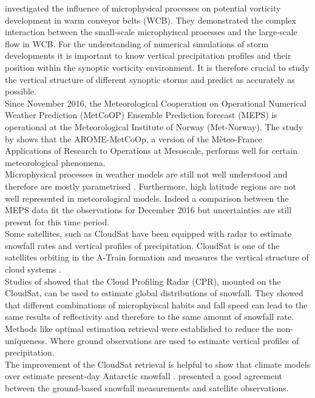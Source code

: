 \cite{joos_influence_2012} investigated the influence of microphysical processes on potential vorticity development in warm conveyor belts (WCB). They demonstrated the complex interaction between the small-scale microphyiscal processes and the large-scale flow in WCB. 
For the understanding of numerical simulations of storm developments it is important to know vertical precipitation profiles and their position within the synoptic vorticity environment. It is therefore crucial to study the vertical structure of different synoptic storms and  predict as accurately as possible.\\
% 
Since November 2016, the Meteorological Cooperation on Operational Numerical Weather Prediction (MetCoOP) Ensemble Prediction forecast (MEPS) is operational at the Meteorological Institute of Norway (Met-Norway). The study by \cite{muller_arome-metcoop:_2017} shows that the AROME-MetCoOp, a version of the Mèteo-France Applications of Research to Operations at Mesoscale, performs well for certain meteorological phenomena. \\
Microphysical processes in weather models are still not well understood and therefore are mostly parametrised \citep{muller_arome-metcoop:_2017}. Furthermore, high latitude regions are not well represented in meteorological models. Indeed a comparison between the MEPS data fit the observations for December 2016 but uncertainties are still present for this time period. 
\\
Some satellites, such as CloudSat have been equipped with radar to estimate snowfall rates and vertical profiles of precipitation. CloudSat is one of the satellites orbiting in the A-Train formation and measures the vertical structure of cloud systems \citep{stephens_cloudsat_2002}. 
\\
Studies of \cite{kulie_utilizing_2009} showed that the Cloud Profiling Radar (CPR), mounted on the CloudSat, can be used to estimate global distributions of snowfall. They showed that different combinations of microphyiscal habits and fall speed can lead to the same results of reflectivity and therefore to the same amount of snowfall rate.
Methods like optimal estimation retrieval were established to reduce the non-uniqueness. Where ground observations are used to estimate vertical profiles of precipitation.\\
The improvement of the CloudSat retrieval is helpful to show that climate models over estimate present-day Antarctic snowfall \citep{palerme_evaluation_2017}. \citet{norin_intercomparison_2015} presented a good agreement between the ground-based snowfall measurements and satellite observations. 

